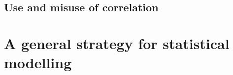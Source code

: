 \documentclass[
  11pt,
  british,
  openany, a4paper]{book}
\begin{document}
\hypertarget{use-and-misuse-of-correlation}{%
\section{Use and misuse of correlation}\label{use-and-misuse-of-correlation}}

\hypertarget{a-general-strategy-for-statistical-modelling}{%
\chapter{A general strategy for statistical modelling}\label{a-general-strategy-for-statistical-modelling}}

  
\end{document}
